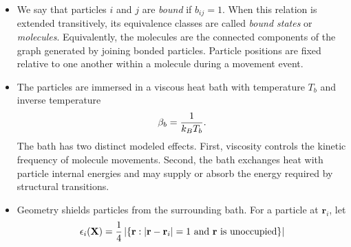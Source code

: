\documentclass[12pt,letterpaper]{article}
\newcommand{\mb}{\mathbf}
\begin{document}
\begin{itemize}
\begin{align*}
U_{ij}(\mb{X}) = \begin{cases}
-1, &b_{ij} = 1, \\
-\eta, &b_{ij} = 0 \textrm{ and } |\mb{r}_{i} - \mb{r}_{j}| = 1, \\
0, &\textrm{else},
\end{cases}
\end{align*}
where $0 < \eta \ll 1$. A bond can only exist between adjacent particles, so $b_{ij}=0$ whenever $|\mb{r}_{i}-\mb{r}_{j}|>1$. The total configurational energy is
\begin{align*}
U(\mb{X}) = \sum_{i<j}U_{ij}(\mb{X}).
\end{align*}
Thus all close interactions are attractive and all energy barriers are configurational or geometric rather than being produced by particle polarity. The weak interaction is chosen so that ordinary contacts produce transient correlations and geometric trapping, while bonds produce much longer-lived structure.
\item We say that particles $i$ and $j$ are \emph{bound} if $b_{ij}=1$. When this relation is extended transitively, its equivalence classes are called \emph{bound states} or \emph{molecules}. Equivalently, the molecules are the connected components of the graph generated by joining bonded particles. Particle positions are fixed relative to one another within a molecule during a movement event. %
\item The particles are immersed in a viscous heat bath with temperature $T_{b}$ and inverse temperature
\begin{align*}
\beta_{b} = {1 \over k_{B}T_{b}}.
\end{align*}
The bath has two distinct modeled effects. First, viscosity controls the kinetic frequency of molecule movements. Second, the bath exchanges heat with particle internal energies and may supply or absorb the energy required by structural transitions.
\item Geometry shields particles from the surrounding bath. For a particle at $\mb{r}_{i}$, let
\begin{align*}
\epsilon_{i}(\mb{X}) = {1 \over 4}\left|\{\mb{r}: |\mb{r}-\mb{r}_{i}|=1 \textrm{ and } \mb{r} \textrm{ is unoccupied}\}\right|
\end{align*}

\end{itemize}
\end{document}
